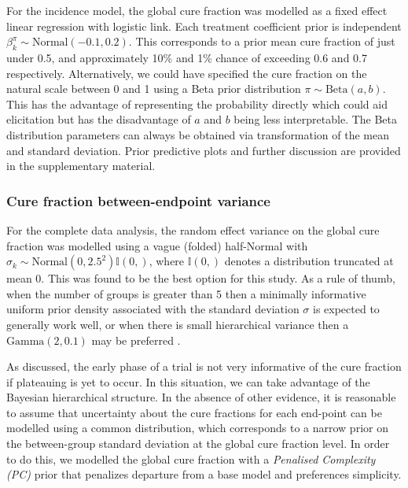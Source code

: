 \documentclass[AMA,STIX1COL]{WileyNJD-v2}
\begin{document}
For the incidence model, the global cure fraction was modelled as a fixed effect linear regression with logistic link. Each treatment coefficient prior is independent $\beta^{\pi}_k \sim \text{Normal}(-0.1, 0.2)$.
This corresponds to a prior mean cure fraction of just under 0.5, and approximately 10\% and 1\% chance of exceeding 0.6 and 0.7 respectively.
Alternatively, we could have specified the cure fraction on the natural scale between 0 and 1 using a Beta prior distribution $\pi \sim \text{Beta}(a, b)$.
This has the advantage of representing the probability directly which could aid elicitation but has the disadvantage of $a$ and $b$ being less interpretable.
The Beta distribution parameters can always be obtained via transformation of the mean and standard deviation.
Prior predictive plots and further discussion are provided in the supplementary material.

\subsubsection{Cure fraction between-endpoint variance}
For the complete data analysis, the random effect variance on the global cure fraction was modelled using a vague (folded) half-Normal \cite{Gelman2006} with 
${\sigma_k \sim \text{Normal}(0, 2.5^2)\mathbb{I}(0,)}$, where $\mathbb{I}(0,)$ denotes a distribution truncated at mean 0.
This was found to be the best option for this study. As a rule of thumb, when the number of groups is greater than 5 then a minimally informative uniform prior density associated with the standard deviation $\sigma$ is expected to generally work well, or when there is small hierarchical variance then a $\text{Gamma}(2, 0.1)$ may be preferred \cite{Chung2013}.

As discussed, the early phase of a trial is not very informative of the cure fraction if plateauing is yet to occur. In this situation, we can take advantage of the Bayesian hierarchical structure. In the absence of other evidence, it is reasonable to assume that uncertainty about the cure fractions for each end-point can be modelled using a common distribution, which corresponds to a narrow prior on the between-group standard deviation at the global cure fraction level.
In order to do this, we modelled the global cure fraction with a {\it Penalised Complexity (PC)} prior \cite{Simpson2017} that penalizes departure from a base model and preferences simplicity.
\end{document}

